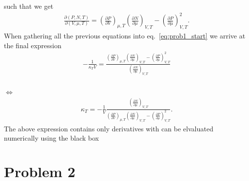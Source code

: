 \documentclass[reprint, amsmath, amssymb, aps, onecolumn]{revtex4-2}
\newcommand{\LLRA}{\\[-1.3\baselineskip] $\Longleftrightarrow$ \\[-1.3\baselineskip]}
\newcommand{\dd}[3]{\left(\frac{\partial #1}{\partial #2}\right)_{#3}}
\begin{document}
such that we get
\begin{align*}
  \frac{\partial (P,N,T)}{\partial (V,\mu,T)} = \dd{P}{V}{\mu,T} \dd{N}{\mu}{V,T} - \dd{P}{\mu}{V,T}^2.
\end{align*}
When gathering all the previous equations into eq.~\eqref{eq:prob1_start} we arrive at the final expression
\begin{align*}
  - \frac{1}{\kappa_T V} =  \frac{\dd{P}{V}{\mu,T} \dd{N}{\mu}{V,T} - \dd{P}{\mu}{V,T}^2}{\dd{N}{\mu}{V,T}}
\end{align*}
\LLRA
\begin{align*}
  \kappa_T = -\frac{1}{V} \frac{\dd{N}{\mu}{V,T}}{\dd{P}{V}{\mu,T} \dd{N}{\mu}{V,T} - \dd{P}{\mu}{V,T}^2}.
\end{align*}
The above expression contains only derivatives with can be elvaluated numerically using the black box
%
%
\section*{Problem 2}
\end{document}

